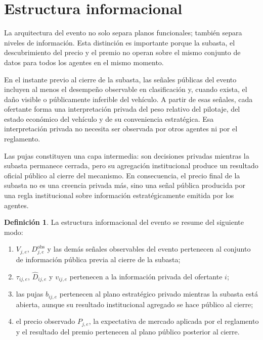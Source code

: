 \documentclass[11pt,a4paper]{article}
\theoremstyle{definition}
\newtheorem{definicion}{Definición}
\begin{document}
\section{Estructura informacional}

La arquitectura del evento no solo separa planos funcionales; también separa niveles de información. Esta distinción es importante porque la subasta, el descubrimiento del precio y el premio no operan sobre el mismo conjunto de datos para todos los agentes en el mismo momento.

En el instante previo al cierre de la subasta, las señales públicas del evento incluyen al menos el desempeño observable en clasificación y, cuando exista, el daño visible o públicamente inferible del vehículo. A partir de esas señales, cada ofertante forma una interpretación privada del peso relativo del pilotaje, del estado económico del vehículo y de su conveniencia estratégica. Esa interpretación privada no necesita ser observada por otros agentes ni por el reglamento.

Las pujas constituyen una capa intermedia: son decisiones privadas mientras la subasta permanece cerrada, pero su agregación institucional produce un resultado oficial público al cierre del mecanismo. En consecuencia, el precio final de la subasta no es una creencia privada más, sino una señal pública producida por una regla institucional sobre información estratégicamente emitida por los agentes.

\begin{definicion}
La estructura informacional del evento se resume del siguiente modo:
\begin{enumerate}
    \item $V_{j,e}$, $D_{j,e}^{\mathrm{obs}}$ y las demás señales observables del evento pertenecen al conjunto de información pública previa al cierre de la subasta;
    \item $\tau_{ij,e}$, $\widehat D_{ij,e}$ y $v_{ij,e}$ pertenecen a la información privada del ofertante $i$;
    \item las pujas $b_{ij,e}$ pertenecen al plano estratégico privado mientras la subasta está abierta, aunque su resultado institucional agregado se hace público al cierre;
    \item el precio observado $P_{j,e}$, la expectativa de mercado aplicada por el reglamento y el resultado del premio pertenecen al plano público posterior al cierre.
\end{enumerate}
\end{definicion}
\end{document}
